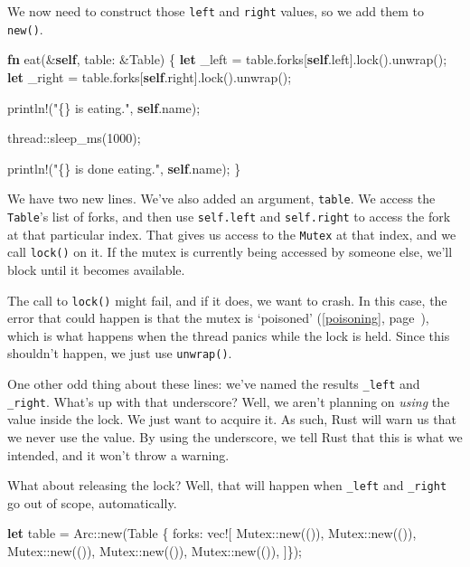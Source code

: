 \documentclass[a4paper,]{book}
\renewcommand*{\hyperref}[2][\ar]{%
  \def\ar{#2}%
  #2 (\autoref{#1}, page~\pageref{#1})}
\newenvironment{Shaded}{\begin{snugshade}}{\end{snugshade}}
\newcommand{\KeywordTok}[1]{\textcolor[rgb]{0.13,0.29,0.53}{\textbf{{#1}}}}
\newcommand{\DecValTok}[1]{\textcolor[rgb]{0.00,0.00,0.81}{{#1}}}
\newcommand{\StringTok}[1]{\textcolor[rgb]{0.31,0.60,0.02}{{#1}}}
\newcommand{\OtherTok}[1]{\textcolor[rgb]{0.56,0.35,0.01}{{#1}}}
\newcommand{\NormalTok}[1]{{#1}}
\begin{document}
We now need to construct those \texttt{left} and \texttt{right} values,
so we add them to \texttt{new()}.

\begin{Shaded}
\begin{Highlighting}[]
\KeywordTok{fn} \NormalTok{eat(&}\KeywordTok{self}\NormalTok{, table: &Table) \{}
    \KeywordTok{let} \NormalTok{_left = table.forks[}\KeywordTok{self}\NormalTok{.left].lock().unwrap();}
    \KeywordTok{let} \NormalTok{_right = table.forks[}\KeywordTok{self}\NormalTok{.right].lock().unwrap();}

    \OtherTok{println!}\NormalTok{(}\StringTok{"\{\} is eating."}\NormalTok{, }\KeywordTok{self}\NormalTok{.name);}

    \NormalTok{thread::sleep_ms(}\DecValTok{1000}\NormalTok{);}

    \OtherTok{println!}\NormalTok{(}\StringTok{"\{\} is done eating."}\NormalTok{, }\KeywordTok{self}\NormalTok{.name);}
\NormalTok{\}}
\end{Highlighting}
\end{Shaded}

We have two new lines. We've also added an argument, \texttt{table}. We
access the \texttt{Table}'s list of forks, and then use
\texttt{self.left} and \texttt{self.right} to access the fork at that
particular index. That gives us access to the \texttt{Mutex} at that
index, and we call \texttt{lock()} on it. If the mutex is currently
being accessed by someone else, we'll block until it becomes available.

The call to \texttt{lock()} might fail, and if it does, we want to
crash. In this case, the error that could happen is that the mutex is
\hyperref[poisoning]{`poisoned'}, which is what happens when the thread
panics while the lock is held. Since this shouldn't happen, we just use
\texttt{unwrap()}.

One other odd thing about these lines: we've named the results
\texttt{\_left} and \texttt{\_right}. What's up with that underscore?
Well, we aren't planning on \emph{using} the value inside the lock. We
just want to acquire it. As such, Rust will warn us that we never use
the value. By using the underscore, we tell Rust that this is what we
intended, and it won't throw a warning.

What about releasing the lock? Well, that will happen when
\texttt{\_left} and \texttt{\_right} go out of scope, automatically.

\begin{Shaded}
\begin{Highlighting}[]
    \KeywordTok{let} \NormalTok{table = Arc::new(Table \{ forks: }\OtherTok{vec!}\NormalTok{[}
        \NormalTok{Mutex::new(()),}
        \NormalTok{Mutex::new(()),}
        \NormalTok{Mutex::new(()),}
        \NormalTok{Mutex::new(()),}
        \NormalTok{Mutex::new(()),}
    \NormalTok{]\});}
\end{Highlighting}
\end{Shaded}
\end{document}
